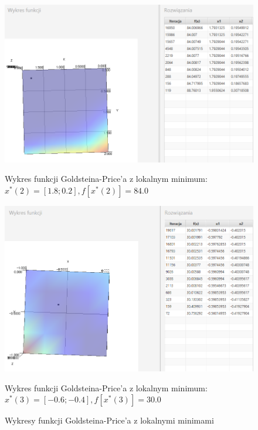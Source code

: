 \documentclass[10pt, a4paper]{article}
\begin{document}
\begin{figure}[htbp] 
	\begin{minipage}[b]{1\textwidth}
		\centering
		\includegraphics[width=\linewidth]{images/goldprice2.PNG}
		\caption{Wykres funkcji Goldsteina-Price’a z lokalnym minimum: $x^*(2)=[1.8; 0.2], f[x^*(2)]=84.0$ }
	\end{minipage} 
	\begin{minipage}[b]{1\textwidth}
		\centering
		\includegraphics[width=\linewidth]{images/goldprice3.PNG}
		\caption{Wykres funkcji Goldsteina-Price’a z lokalnym minimum: $x^*(3)=[-0.6; -0.4], f[x^*(3)] = 30.0$ }
	\end{minipage}
	\caption{Wykresy funkcji Goldsteina-Price’a z lokalnymi minimami }
	\label{fig:62}
\end{figure}
\end{document}
